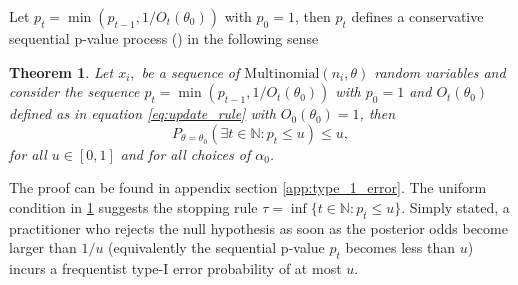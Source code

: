 \documentclass[11pt]{article}
\newtheorem{thm}{Theorem}[section]
\begin{document}
Let $p_t = \min(p_{t-1}, 1/O_t(\theta_0))$ with $p_0=1$, then $p_t$ defines a conservative sequential p-value process (\cite{johari}) in the following sense
\begin{thm}
  \label{thm:type_1_error}
Let $x_i,$ be a sequence of $\text{Multinomial}(n_i,\theta)$ random variables and consider the sequence $p_t = \min(p_{t-1}, 1/O_t(\theta_0))$ with $p_0=1$ and $O_t(\theta_0)$ defined as in equation \eqref{eq:update_rule} with $O_0(\theta_0)=1$, then
\begin{equation}
  P_{\theta = \theta_0}\left( \exists t \in \mathbb{N}: p_t \leq u \right) \leq u,
\end{equation}
for all $u \in [0,1]$ and for all choices of $\alpha_0$. 
\end{thm}
The proof can be found in appendix section \ref{app:type_1_error}.
The uniform condition in \ref{thm:type_1_error} suggests the stopping rule $\tau = \inf \lbrace t \in \mathbb{N}: p_t \leq u \rbrace$. Simply stated, a practitioner who rejects the null hypothesis as soon as the posterior odds become larger than $1/u$ (equivalently the sequential p-value $p_t$ becomes less than $u$) incurs a frequentist type-I error probability of at most $u$.
\end{document}
